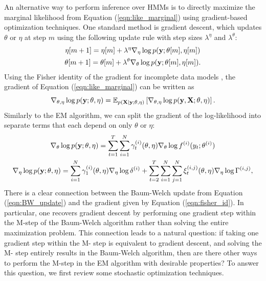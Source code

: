 An alternative way to perform inference over HMMs is to directly maximize the marginal likelihood from Equation (\ref{eqn:like_marginal}) using gradient-based optimization techniques. One standard method is gradient descent, which updates $\theta$ or $\eta$ at step $m$ using the following update rule with step sizes $\lambda^\eta$ and $\lambda^\theta$:
%
\begin{gather}
    \eta[m+1] = \eta[m] + \lambda^{\eta} \nabla_\eta \log p(\mathbf{y};\theta[m],\eta[m]) \\
    \theta[m+1] = \theta[m] + \lambda^{\theta} \nabla_\theta \log p(\mathbf{y};\theta[m],\eta[m]).
    \label{eqn:grad_update}
\end{gather}
%
Using the Fisher identity of the gradient for incomplete data models \citep{Fisher:1925}, the gradient of Equation (\ref{eqn:like_marginal}) can be written as
%
\begin{equation}
    \nabla_{\theta,\eta} \log p(\mathbf{y};\theta,\eta) = \mathbb{E}_{p(\mathbf{X} \mid \mathbf{y};\theta,\eta)}\left[ \nabla_{\theta,\eta} \log p(\mathbf{y},\mathbf{X};\theta,\eta) \right].
    \label{eqn:fisher_id}
\end{equation}
%
Similarly to the EM algorithm, we can split the gradient of the log-likelihood into separate terms that each depend on only $\theta$ or $\eta$:
%
\begin{gather}
    \nabla_{\theta} \log p(\mathbf{y};\theta,\eta) = \sum_{t=1}^T \sum_{i=1}^N \gamma_t^{(i)}(\theta,\eta) \nabla_{\theta} \log f^{(i)}(y_t;\theta^{(i)}) \label{eqn:theta_update_gd} \\
    \nabla_{\eta} \log p(\mathbf{y};\theta,\eta) = \sum_{i=1}^N \gamma_1^{(i)}(\theta,\eta) \nabla_{\eta} \log \delta^{(i)} + \sum_{t=2}^{T} \sum_{i=1}^N \sum_{j=1}^N \xi_t^{(i,j)}(\theta,\eta) \nabla_{\eta} \log \Gamma^{(i,j)}, \label{eqn:eta_update_gd}
\end{gather}
%
There is a clear connection between the Baum-Welch update from Equation (\ref{eqn:BW_update}) and the gradient given by Equation (\ref{eqn:fisher_id}). In particular, one recovers gradient descent by performing one gradient step within the M-step of the Baum-Welch algorithm rather than solving the entire maximization problem. This connection leads to a natural question: if taking one gradient step within the M- step is equivalent to gradient descent, and solving the M- step entirely results in the Baum-Welch algorithm, then are there other ways to perform the M-step in the EM algorithm with desirable properties? To answer this question, we first review some stochastic optimization techniques.

